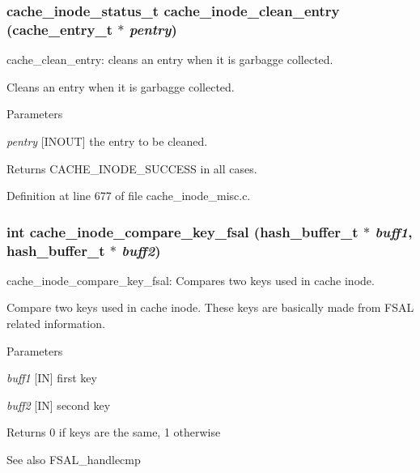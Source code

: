 \subsubsection[{cache\_\-inode\_\-clean\_\-entry}]{\setlength{\rightskip}{0pt plus 5cm}cache\_\-inode\_\-status\_\-t cache\_\-inode\_\-clean\_\-entry (cache\_\-entry\_\-t $\ast$ {\em pentry})}\label{cache__inode__misc_8c_aefe5de533cbaea1af0370e4393c74c4c}
cache\_\-clean\_\-entry: cleans an entry when it is garbagge collected.

Cleans an entry when it is garbagge collected.


\begin{DoxyParams}{Parameters}
\item[{\em pentry}][INOUT] the entry to be cleaned.\end{DoxyParams}
\begin{DoxyReturn}{Returns}
CACHE\_\-INODE\_\-SUCCESS in all cases. 
\end{DoxyReturn}


Definition at line 677 of file cache\_\-inode\_\-misc.c.
\subsubsection[{cache\_\-inode\_\-compare\_\-key\_\-fsal}]{\setlength{\rightskip}{0pt plus 5cm}int cache\_\-inode\_\-compare\_\-key\_\-fsal (hash\_\-buffer\_\-t $\ast$ {\em buff1}, \/  hash\_\-buffer\_\-t $\ast$ {\em buff2})}\label{cache__inode__misc_8c_ab2ed61f21523805c300eae3d843ada57}
cache\_\-inode\_\-compare\_\-key\_\-fsal: Compares two keys used in cache inode.

Compare two keys used in cache inode. These keys are basically made from FSAL related information.


\begin{DoxyParams}{Parameters}
\item[{\em buff1}][IN] first key \item[{\em buff2}][IN] second key \end{DoxyParams}
\begin{DoxyReturn}{Returns}
0 if keys are the same, 1 otherwise
\end{DoxyReturn}
\begin{DoxySeeAlso}{See also}
FSAL\_\-handlecmp 
\end{DoxySeeAlso}


